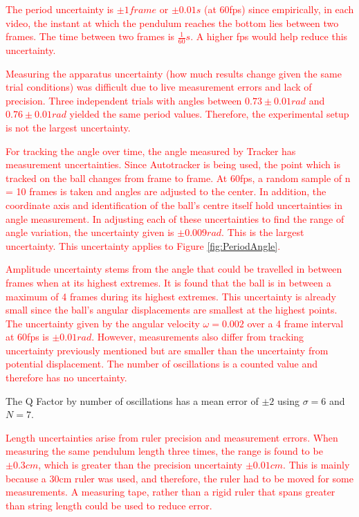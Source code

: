 \documentclass[12pt,twocolumn]{article}
\begin{document}
\textcolor{red}{The period uncertainty is $\pm 1 frame$ or
$\pm 0.01s$ (at 60fps) since empirically, in each
video, the instant at which the pendulum
reaches the bottom lies between two frames.
The time between two frames is $\frac{1}{60}s$. A higher
fps would help reduce this uncertainty.}

\textcolor{red}{Measuring the apparatus uncertainty (how
much results change given the same trial conditions) was difficult due to live measurement
errors and lack of precision. Three independent trials with angles between $0.73\pm0.01rad$
and $0.76 \pm 0.01rad$ yielded the same period values. Therefore, the experimental setup is not the 
largest uncertainty.}

\textcolor{red}{For tracking the angle over time, the angle
measured by Tracker has measurement uncertainties. Since Autotracker is being used,
the point which is tracked on the ball changes
from frame to frame. At 60fps, a random
sample of n = 10 frames is taken and angles
are adjusted to the center. In addition, the
coordinate axis and identification of the ball's
centre itself hold uncertainties in angle measurement. 
In adjusting each of these uncertainties to find the range of angle variation,
the uncertainty given is $\pm0.009rad$. This is
the largest uncertainty. This uncertainty applies to 
Figure \ref{fig:PeriodAngle}.}

\textcolor{red}{Amplitude uncertainty stems from the angle that could be travelled in between frames
when at its highest extremes. It is found that
the ball is in between a maximum of 4 frames
during its highest extremes. This uncertainty
is already small since the ball's angular displacements are smallest at the highest points.
The uncertainty given by the angular velocity
$\omega = 0.002$ over a 4 frame interval at 60fps is
$\pm0.01rad$. However, measurements also differ from tracking uncertainty previously 
mentioned but are smaller than the uncertainty
from potential displacement. The number of
oscillations is a counted value and therefore
has no uncertainty.}

The Q Factor by number of oscillations has a mean error of $\pm 2$ using $\sigma = 6$ and $N = 7$.

\textcolor{red}{Length uncertainties arise from ruler
precision and measurement errors. When
measuring the same pendulum length three
times, the range is found to be $\pm0.3 cm$,
which is greater than the precision uncertainty $\pm0.01 cm$. This is mainly because a
30cm ruler was used, and therefore, the ruler
had to be moved for some measurements. A
measuring tape, rather than a rigid ruler that
spans greater than string length could be used
to reduce error.}
\end{document}
